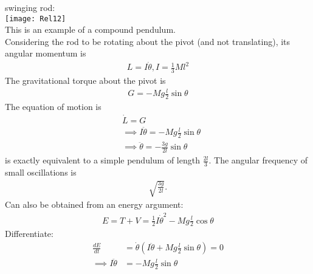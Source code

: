 \documentclass[a4paper]{article}
\begin{document}
\begin{eg} swinging rod:\\
\texttt{[image: Rel12]}\\
This is an example of a compound pendulum.\\
Considering the rod to be rotating about the pivot (and not translating), its angular momentum is
\begin{equation*}
\begin{aligned}
L=I\dot{\theta}, I=\frac{1}{3}Ml^2
\end{aligned}
\end{equation*}
The gravitational torque about the pivot is
\begin{equation*}
\begin{aligned}
G=-Mg\frac{l}{2}\sin\theta
\end{aligned}
\end{equation*}
The equation of motion is
\begin{equation*}
\begin{aligned}
&\dot{L}=G\\
&\implies I\ddot{\theta}=-Mg\frac{l}{2}\sin\theta\\
&\implies \ddot{\theta}=-\frac{3g}{2l}\sin\theta
\end{aligned}
\end{equation*}
is exactly equivalent to a simple pendulum of length $\frac{2l}{3}$. The angular frequency of small oscillations is
\begin{equation*}
\begin{aligned}
\sqrt{\frac{3g}{2l}}.
\end{aligned}
\end{equation*}
Can also be obtained from an energy argument:
\begin{equation*}
\begin{aligned}
E=T+V = \frac{1}{2}I \dot{\theta}^2 - Mg\frac{l}{2}\cos\theta
\end{aligned}
\end{equation*}
Differentiate:
\begin{equation*}
\begin{aligned}
\frac{dE}{dt}&=\dot{\theta}\left(I\ddot{\theta}+Mg\frac{l}{2}\sin\theta\right) = 0\\
\implies I\ddot{\theta}&=-Mg\frac{l}{2}\sin\theta
\end{aligned}
\end{equation*}
\end{eg}
\end{document}
